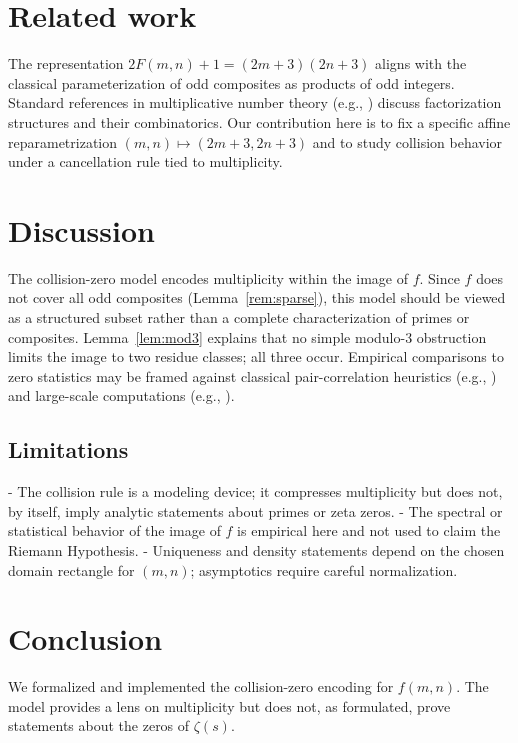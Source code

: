 \documentclass[12pt,a4paper]{article}
\begin{document}
\section{Related work}
The representation \(2F(m,n)+1=(2m+3)(2n+3)\) aligns with the classical parameterization of odd composites as products of odd integers. Standard references in multiplicative number theory (e.g., \cite{hardywright2008, montgomery2007}) discuss factorization structures and their combinatorics. Our contribution here is to fix a specific affine reparametrization \((m,n)\mapsto (2m+3,2n+3)\) and to study collision behavior under a cancellation rule tied to multiplicity.

\section{Discussion}
The collision-zero model encodes multiplicity within the image of \(f\). Since \(f\) does not cover all odd composites (Lemma~\ref{rem:sparse}), this model should be viewed as a structured subset rather than a complete characterization of primes or composites. Lemma~\ref{lem:mod3} explains that no simple modulo-3 obstruction limits the image to two residue classes; all three occur. Empirical comparisons to zero statistics may be framed against classical pair-correlation heuristics (e.g., \cite{montgomery1973}) and large-scale computations (e.g., \cite{odlyzko1987}).

\subsection*{Limitations}
- The collision rule is a modeling device; it compresses multiplicity but does not, by itself, imply analytic statements about primes or zeta zeros.
- The spectral or statistical behavior of the image of \(f\) is empirical here and not used to claim the Riemann Hypothesis.
- Uniqueness and density statements depend on the chosen domain rectangle for \((m,n)\); asymptotics require careful normalization.

\section{Conclusion}
We formalized and implemented the collision-zero encoding for \(f(m,n)\). The model provides a lens on multiplicity but does not, as formulated, prove statements about the zeros of \(\zeta(s)\).

\appendix
\end{document}
